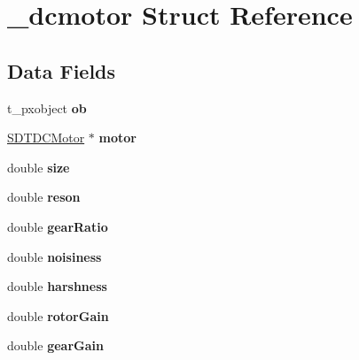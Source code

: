 \hypertarget{struct__dcmotor}{}\section{\+\_\+dcmotor Struct Reference}
\label{struct__dcmotor}
\subsection*{Data Fields}
\begin{DoxyCompactItemize}
\item 
\hypertarget{struct__dcmotor_a55b4380edb216f04a1c42b9095594963}{}t\+\_\+pxobject {\bfseries ob}\label{struct__dcmotor_a55b4380edb216f04a1c42b9095594963}

\item 
\hypertarget{struct__dcmotor_a1326680f5831f7b1a70c8359047f966e}{}\hyperlink{struct_s_d_t_d_c_motor}{S\+D\+T\+D\+C\+Motor} $\ast$ {\bfseries motor}\label{struct__dcmotor_a1326680f5831f7b1a70c8359047f966e}

\item 
\hypertarget{struct__dcmotor_aba3c5d750d5dbd6e86c11ecaca62885e}{}double {\bfseries size}\label{struct__dcmotor_aba3c5d750d5dbd6e86c11ecaca62885e}

\item 
\hypertarget{struct__dcmotor_acb544de8d3dfc6f86b0e117dbd68b80d}{}double {\bfseries reson}\label{struct__dcmotor_acb544de8d3dfc6f86b0e117dbd68b80d}

\item 
\hypertarget{struct__dcmotor_a1c7f052bd8bc7f3cdf72da82d934e7ef}{}double {\bfseries gear\+Ratio}\label{struct__dcmotor_a1c7f052bd8bc7f3cdf72da82d934e7ef}

\item 
\hypertarget{struct__dcmotor_adf6fac0c8c8966b4c23848e49ab71b5e}{}double {\bfseries noisiness}\label{struct__dcmotor_adf6fac0c8c8966b4c23848e49ab71b5e}

\item 
\hypertarget{struct__dcmotor_a063eb6c03d83c5686b2bb5a56f3fc466}{}double {\bfseries harshness}\label{struct__dcmotor_a063eb6c03d83c5686b2bb5a56f3fc466}

\item 
\hypertarget{struct__dcmotor_a1129271e63a92d045d34cb12196b29ee}{}double {\bfseries rotor\+Gain}\label{struct__dcmotor_a1129271e63a92d045d34cb12196b29ee}

\item 
\hypertarget{struct__dcmotor_a14572f2e6c6cc3404192eeba192233e1}{}double {\bfseries gear\+Gain}\label{struct__dcmotor_a14572f2e6c6cc3404192eeba192233e1}


\end{DoxyCompactItemize}
